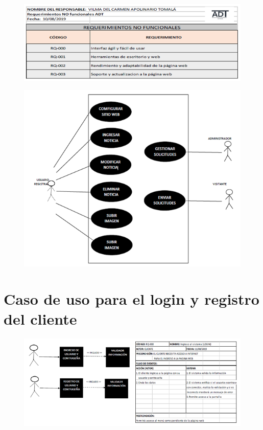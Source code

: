 \documentclass[12pt,a4paper]{article}
\begin{document}
\begin{figure}[hbtp]
\caption{}
\centering
\includegraphics[scale=0.5]{TERCERA.png}
\end{figure}


\begin{figure}[hbtp]
\caption{}
\centering
\includegraphics[scale=0.5]{CUARTA.png}
\end{figure}



\section*{Caso de uso para el login y registro del cliente}
\begin{figure}[hbtp]
\caption{}
\centering
\includegraphics[scale=0.7]{QUINTA.png}
\end{figure}
\end{document}

